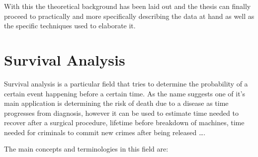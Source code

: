 With this the theoretical background has been laid out and the thesis can finally proceed to practically and more specifically describing the data at hand as well as the specific techniques used to elaborate it.

\section{Survival Analysis}
Survival analysis is a particular field that tries to determine the probability of a certain event happening before a certain time.
As the name suggests one of it's main application is determining the risk of death due to a disease as time progresses from diagnosis, however it can be used to estimate time needed to recover after a surgical procedure, lifetime before breakdown of machines, time needed for criminals to commit new crimes after being released \ldots. 

The main concepts and terminologies in this field are:

